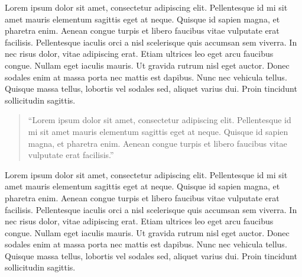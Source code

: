 Lorem ipsum dolor sit amet, consectetur adipiscing elit. Pellentesque id mi sit
amet mauris elementum sagittis eget at neque. Quisque id sapien magna, et
pharetra enim. Aenean congue turpis et libero faucibus vitae vulputate erat
facilisis. Pellentesque iaculis orci a nisl scelerisque
quis accumsan sem viverra. In nec risus dolor, vitae adipiscing erat. Etiam
ultrices leo eget arcu faucibus congue. Nullam eget iaculis mauris. Ut gravida
rutrum nisl eget auctor. Donec sodales enim at massa porta nec mattis est
dapibus. Nunc nec vehicula tellus. Quisque massa tellus, lobortis vel sodales
sed, aliquet varius dui. Proin tincidunt sollicitudin sagittis. 
\begin{quote}
 ``Lorem ipsum dolor sit amet, consectetur adipiscing elit. Pellentesque id mi
sit amet mauris elementum sagittis eget at neque. Quisque id sapien magna, et
pharetra enim. Aenean congue turpis et libero faucibus vitae vulputate erat
facilisis.''
\end{quote}
Lorem ipsum dolor sit amet, consectetur adipiscing elit. Pellentesque id mi sit
amet mauris elementum sagittis eget at neque. Quisque id sapien magna, et
pharetra enim. Aenean congue turpis et libero faucibus vitae vulputate erat
facilisis. Pellentesque iaculis orci a nisl scelerisque quis accumsan sem
viverra. In nec risus dolor, vitae adipiscing erat. Etiam ultrices leo eget arcu
faucibus congue. Nullam eget iaculis mauris. Ut gravida rutrum nisl eget auctor.
Donec sodales enim at massa porta nec mattis est dapibus. Nunc nec vehicula
tellus. Quisque massa tellus, lobortis vel sodales sed, aliquet varius dui.
Proin tincidunt sollicitudin sagittis. 
